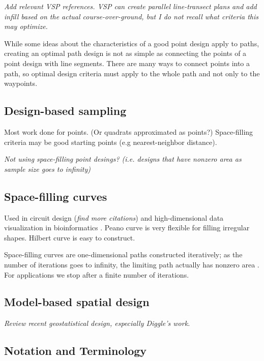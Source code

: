 \documentclass[review]{elsarticle}
\begin{document}
{\it Add relevant VSP references. VSP can create parallel line-transect plans
and add infill based on the actual course-over-ground, but I do not recall what
criteria this may optimize.}

While some ideas about the characteristics of a good point design apply to
paths, creating an optimal path design is not as simple as connecting the
points of a point design with line segments. There are many ways to connect
points into a path, so optimal design criteria must apply to the whole path and
not only to the waypoints.


\subsection{Design-based sampling}

Most work done for points. (Or quadrats approximated as points?) Space-filling
criteria may be good starting points (e.g nearest-neighbor distance).

{\it Not using space-filling point desings? (i.e. designs that have nonzero
area as sample size goes to infinity)}


\subsection{Space-filling curves}

Used in circuit design \citep{fanetal} ({\it find more citations}) and
high-dimensional data visualization in bioinformatics \citep{hilbertvis}.
Peano curve is very flexible for filling irregular shapes\citep{fanetal}.
Hilbert curve is easy to construct.

Space-filling curves are one-dimensional paths constructed iteratively; as the
number of iterations goes to infinity, the limiting path actually has nonzero
area \citep{sagan}. For applications we stop after a finite number of
iterations.


\subsection{Model-based spatial design}

{\it Review recent geostatistical design, especially Diggle's work.}


\subsection{Notation and Terminology}
\end{document}

